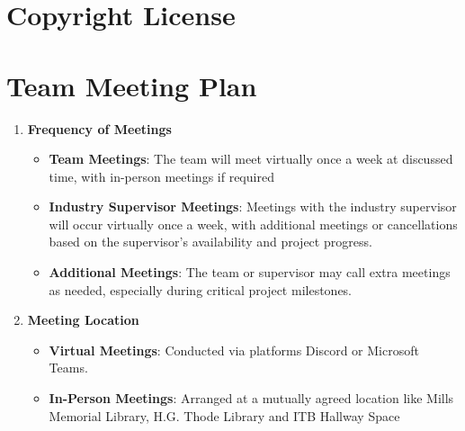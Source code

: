 \documentclass{article}
\begin{document}
\section{Copyright License}


\section{Team Meeting Plan}

\begin{enumerate}[label=\textbf{\arabic*}]
    \item \textbf{Frequency of Meetings}
    \begin{itemize}
        \item \textbf{Team Meetings}: The team will meet virtually once a week at discussed time, with in-person meetings if required
        \item \textbf{Industry Supervisor Meetings}: Meetings with the industry supervisor will occur virtually once a week, with additional meetings or cancellations based on the supervisor's availability and project progress.
        \item \textbf{Additional Meetings}: The team or supervisor may call extra meetings as needed, especially during critical project milestones.
    \end{itemize}
    
    \item \textbf{Meeting Location}
    \begin{itemize}
        \item \textbf{Virtual Meetings}: Conducted via platforms Discord or Microsoft Teams.
        \item \textbf{In-Person Meetings}: Arranged at a mutually agreed location like Mills Memorial Library, H.G. Thode Library and ITB Hallway Space 
    \end{itemize}


\end{enumerate}
\end{document}
